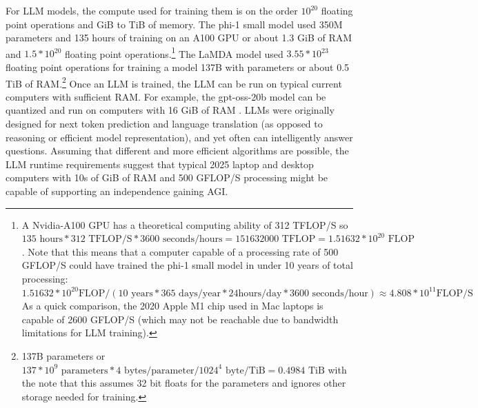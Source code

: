 \documentclass[letterpaper,twocolumn]{article}
\begin{document}
For LLM models, the compute used for training them is on the order
$10^{20}$ floating point operations and GiB to TiB of memory. The
phi-1 small model \citep{gunasekar2023textbooksneed} used 350M
parameters and 135 hours of training on an A100 GPU or about 1.3 GiB
of RAM and $1.5*10^{20}$ floating point operations.\footnote{A
Nvidia-A100 GPU has a theoretical computing ability of 312 TFLOP/S
\citep{nvidiaa100} so $135 \text{ hours}*312 \text{ TFLOP/S} *3600
\text{ seconds/hours} = 151632000 \text{ TFLOP} = 1.51632*10^{20}
\text{ FLOP}$.  Note that this means that a computer capable of a
processing rate of 500 GFLOP/S could have trained the phi-1 small
model in under 10 years of total processing: $1.51632*10^{20} \text{
  FLOP} / (10 \text{ years} * 365 \text{ days/year} * 24 \text{
  hours/day} * 3600 \text{ seconds/hour}) \approx 4.808*10^{11} \text{
  FLOP/S}$ As a quick comparison, the 2020 Apple M1 chip used in Mac
laptops is capable of 2600 GFLOP/S (which may not be reachable due to bandwidth limitations for LLM training).} The LaMDA model
\citep[Section 10]{thoppilan2022lamdalanguagemodelsdialog} used
$3.55*10^{23}$ floating point operations for training a model 137B with
parameters or about 0.5 TiB of RAM.\footnote{137B parameters or
$137*10^9 \text{ parameters} * 4 \text{ bytes/parameter}/ 1024^4
\text{ byte/TiB} = 0.4984 \text{ TiB}$ with the note that this assumes
32 bit floats for the parameters and ignores other storage needed for
training.} Once an LLM is trained, the LLM can be run on typical current
computers with sufficient RAM. For example, the gpt-oss-20b model
\citep{openai2025gptoss120bgptoss20bmodel} can be quantized and run on
computers with 16 GiB of RAM \citep{huggingfacegptoss}.  LLMs were
originally designed for next token prediction and language
translation (as opposed to reasoning or efficient model
representation), and yet often can intelligently answer
questions. Assuming that different and more efficient algorithms are
possible, the LLM runtime requirements suggest that typical 2025
laptop and desktop computers with 10s of GiB of RAM and 500 GFLOP/S
processing might be capable of supporting an independence gaining AGI.
\end{document}

